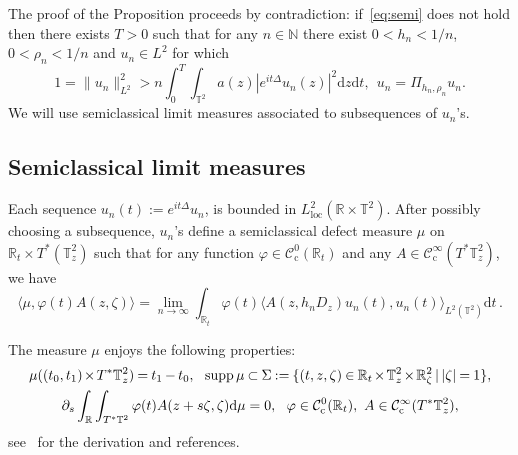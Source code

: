 \documentclass[AHL, Unicode, longabstracts]{cedram}
\DeclareMathOperator{\supp}{supp}
\newcommand{\CIc}{{\mathcal C}^\infty_{\mathrm{c}} }
\newcommand{\NN}{{\mathbb N}}
\newcommand{\R}{{\mathbb R}}
\newcommand{\TT}{{\mathbb T}}
\newcommand{\TT}{{\mathbb T}}
\newcommand{\R}{{\mathbb R}}
\newcommand{\loc}{\mathrm{loc}}
\newcommand*{\dd}{\mathrm{d}}
\newcommand*{\dz}{\dd z}
\newcommand*{\dt}{\dd t}
\newcommand*{\dmu}{\dd \mu}
\newcommand*{\mk}{\mkern -1mu}
\newcommand*{\Mk}{\mkern -2mu}
\newcommand*{\tq}{\,|\,}
\begin{document}
The proof of the Proposition proceeds by contradiction: if~\eqref{eq:semi} does not hold then there exists $ T > 0 $ such that for any $ n \in \NN $ there exist $ 0 < h_n < 1/n $, $ 0 < \rho_n < 1/n $ and $ u_n \in L^2 $ for which
\begin{equation}\label{eq:contr}
1 = \| u_n \|_{ L^2 }^2 > n \int_0^T \!\!\int_{ \TT^2} a (z) | e^{ i t \Delta} u_n (z) |^2 \dz \dt, \ \ u_n = \Pi_{ h_n, \rho_n } u_n.
\end{equation}
We will use semiclassical limit measures associated to subsequences of $ u_n$'s.

\subsection{Semiclassical limit measures}

Each sequence $ u_n (t) := e^{ i t \Delta } u_n $, is bounded in $L^2_{\loc} (\mathbb{R} \times \TT^2)$. After possibly choosing a subsequence, $ u_n $'s define a semiclassical defect measure $\mu $ on $\R_t \times T^* (\TT^2_z)$ such that for any function $\varphi \in {\mathcal C}^0_{\mathrm{c}} (\R_t)$ and any $A\in \CIc (T^*\TT^2_z)$, we have
\begin{equation}\label{eq:mu}
\langle \mu, \varphi(t) A(z, \zeta)\rangle = \lim_{n\rightarrow \infty} \int_{\R_t } \varphi(t)
\langle A(z, h_{n} D_z) u_{n} (t), u_n (t)
\rangle_{ L^2 (\TT^2) } \dt \,.
\end{equation}

The measure $ \mu $ enjoys the following properties:
\begin{gather}\label{eq:propmu}
\begin{gathered}
\!\mu ((t_0, t_1) \Mk\times\Mk T^*\TT^2_z) \mk=\mk t_1 \mk-\mk t_0, \ \
\supp \mu \mk\subset\mk \Sigma \mk:=\mk \{(t,z, \zeta) \mk\in\mk \R_t \Mk\times\Mk \TT^2_z \Mk\times\Mk \R^2_\zeta \tq |\zeta|\mk=\mk 1\},\! \\
\partial_s \int_{\R} \int_{ T^* \TT^2 } \varphi(t) A (z + s \zeta, \zeta) \dmu = 0,
\ \ \varphi \in {\mathcal C}^0_{\mathrm{c}} (\R_t), \ A \in \CIc (T^*\TT^2_z),
\end{gathered}
\end{gather}
see~\cite{Ma} for the derivation and references.
\end{document}
